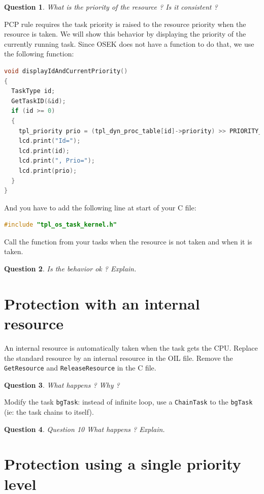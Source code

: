 \documentclass[11pt]{report}
\newtheorem{ex}{Question}
\begin{document}
\begin{ex}
\label{questionneedscode}
What is the priority of the resource ? Is it consistent ?
\end{ex}

PCP rule requires the task priority is raised to the resource priority when the resource is taken. We will show this behavior by displaying the priority of the currently running task. Since OSEK does not have a function to do that, we use the following function:

\begin{lstlisting}[language=C]
void displayIdAndCurrentPriority()
{
  TaskType id;
  GetTaskID(&id);
  if (id >= 0)
  {
    tpl_priority prio = (tpl_dyn_proc_table[id]->priority) >> PRIORITY_SHIFT;
    lcd.print("Id=");
    lcd.print(id);
    lcd.print(", Prio=");
    lcd.print(prio); 
  }
}
\end{lstlisting}

And you have to add the following line at start of your C file:

\begin{lstlisting}[language=C]
 #include "tpl_os_task_kernel.h"
\end{lstlisting}

Call the function from your tasks when the resource is not taken and when it is taken.

\begin{ex}
Is the behavior ok ? Explain.
\end{ex}

\section{Protection with an internal resource}

An internal resource is automatically taken when the task gets the CPU. Replace the standard resource by an internal resource in the OIL file. Remove the \texttt{GetResource} and \texttt{ReleaseResource} in the C file.

\begin{ex}
What happens ? Why ?
\end{ex}

Modify the task \texttt{bgTask}: instead of infinite loop, use a \texttt{ChainTask} to the \texttt{bgTask} (ie: the task chains to itself).

\begin{ex}
Question 10 What happens ? Explain.
\end{ex}

\section{Protection using a single priority level}
\end{document}
